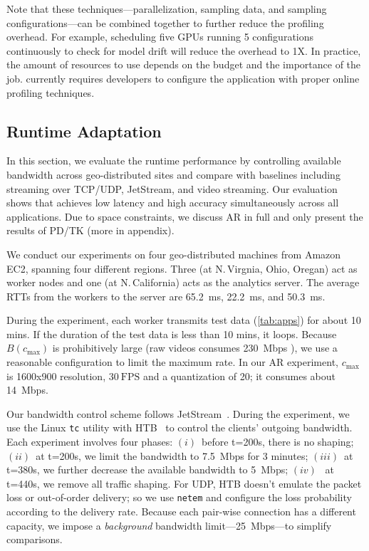 Note that these techniques---parallelization, sampling data, and sampling
configurations---can be combined together to further reduce the profiling
overhead. For example, scheduling five GPUs running 5 configurations
continuously to check for model drift will reduce the overhead to 1X\@. In
practice, the amount of resources to use depends on the budget and the
importance of the job. \sysname{} currently requires developers to configure the
application with proper online profiling techniques.


\subsection{Runtime Adaptation}
\label{sec:runtime-adaptation}

In this section, we evaluate the runtime performance by controlling available
bandwidth across geo-distributed sites and compare \sysname{} with baselines
including streaming over TCP/UDP, JetStream, and video streaming. Our evaluation
shows that \sysname{} achieves low latency and high accuracy simultaneously
across all applications. Due to space constraints, we discuss AR in full and
only present the results of PD/TK (more in appendix).

 We conduct our experiments on four geo-distributed
machines from Amazon EC2, spanning four different regions. Three (at
N.\,Virgnia, Ohio, Oregan) act as worker nodes and one (at N.\,California) acts
as the analytics server. The average RTTs from the workers to the server are
\SI{65.2}{\ms}, \SI{22.2}{\ms}, and \SI{50.3}{ms}.

During the experiment, each worker transmits test data (\autoref{tab:apps}) for
about 10 mins. If the duration of the test data is less than 10 mins, it
loops. Because $B(c_{\max})$ is prohibitively large (raw videos consumes
\SI{230}{Mbps} ), we use a reasonable configuration to limit the maximum
rate. In our AR experiment, $c_{\max}$ is 1600x900 resolution, \(30~\text{FPS}\)
and a quantization of 20; it consumes about \SI{14}{Mbps}.

Our bandwidth control scheme follows
JetStream~\cite{rabkin2014aggregation}. During the experiment, we use the Linux
\texttt{tc} utility with HTB~\cite{htb, lartc} to control the clients' outgoing
bandwidth. Each experiment involves four phases: $(i)$~before t=200s, there is
no shaping; $(ii)$~at t=200s, we limit the bandwidth to \SI{7.5}{Mbps} for 3
minutes; $(iii)$~at t=380s, we further decrease the available bandwidth to
\SI{5}{Mbps}; $(iv)$~ at t=440s, we remove all traffic shaping. For UDP, HTB
doesn't emulate the packet loss or out-of-order delivery; so we use
\texttt{netem} and configure the loss probability according to the delivery
rate. Because each pair-wise connection has a different capacity, we impose a
\textit{background} bandwidth limit---\SI{25}{Mbps}---to simplify comparisons.

